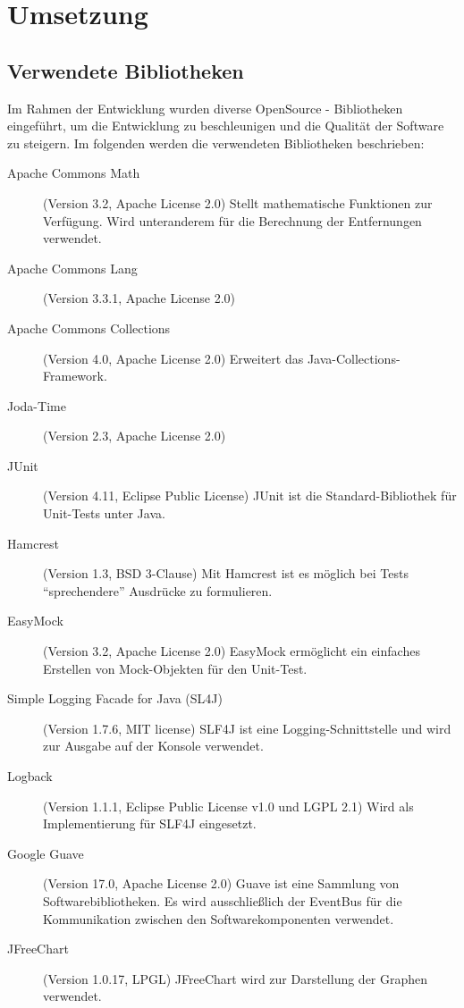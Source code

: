 \section{Umsetzung}

\subsection{Verwendete Bibliotheken}
Im Rahmen der Entwicklung wurden diverse OpenSource - Bibliotheken eingeführt, um die Entwicklung zu beschleunigen und die Qualität der Software zu steigern. Im folgenden werden die verwendeten Bibliotheken beschrieben:
\begin{description}
 \item[Apache Commons Math] (Version 3.2, Apache License 2.0) \cite{apache:CommonsMath} Stellt mathematische Funktionen zur Verfügung. Wird unteranderem für die Berechnung der Entfernungen verwendet.
 \item[Apache Commons Lang] (Version 3.3.1, Apache License 2.0) \cite{apache:CommonsLang} %
 \item[Apache Commons Collections] (Version 4.0, Apache License 2.0) \cite{apache:CommonsCollection} Erweitert das Java-Collec\-tions-Framework. 
 \item[Joda-Time] (Version 2.3, Apache License 2.0) \cite{joda:jodatime} %
 \item[JUnit] (Version 4.11, Eclipse Public License) \cite{junit:junit} JUnit ist die Standard-Bibliothek für Unit-Tests unter Java. 
 \item[Hamcrest] (Version 1.3, BSD 3-Clause) \cite{hamcrest:hamcrest} Mit Hamcrest ist es möglich bei Tests "`sprechendere"' Ausdrücke zu formulieren.
 \item[EasyMock] (Version 3.2, Apache License 2.0) \cite{easymock:easymock} EasyMock ermöglicht ein einfaches Erstellen von Mock-Objekten für den Unit-Test.
 \item[Simple Logging Facade for Java (SL4J)] (Version 1.7.6, MIT license) \cite{qos:slfj} SLF4J ist eine Log\-ging-Schnittstelle und wird zur Ausgabe auf der Konsole verwendet.
 \item[Logback] (Version 1.1.1, Eclipse Public License v1.0 und LGPL 2.1) \cite{qos:logback} Wird als Implementierung für SLF4J eingesetzt.
 \item[Google Guave] (Version 17.0, Apache License 2.0) \cite{google:guave} Guave ist eine Sammlung von Softwarebibliotheken. Es wird ausschließlich der EventBus für die Kommunikation zwischen den Softwarekomponenten verwendet.
 \item[JFreeChart] (Version 1.0.17, LPGL) \cite{ObjectRefineryLimited:JFreeChart} JFreeChart wird zur Darstellung der Graphen verwendet.
\end{description}

